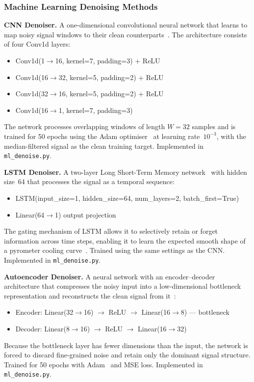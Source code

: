 \subsubsection*{Machine Learning Denoising Methods}

\textbf{CNN Denoiser.} A one-dimensional convolutional neural network that learns to map noisy signal windows to their clean counterparts~\cite{lecun1989backpropagation}. The architecture consists of four Conv1d layers:
\begin{itemize}[nosep]
\item Conv1d(1$\to$16, kernel=7, padding=3) + ReLU
\item Conv1d(16$\to$32, kernel=5, padding=2) + ReLU
\item Conv1d(32$\to$16, kernel=5, padding=2) + ReLU
\item Conv1d(16$\to$1, kernel=7, padding=3)
\end{itemize}
The network processes overlapping windows of length $W=32$ samples and is trained for 50 epochs using the Adam optimiser~\cite{kingma2014adam} at learning rate~$10^{-3}$, with the median-filtered signal as the clean training target. Implemented in \texttt{ml\_denoise.py}.

\textbf{LSTM Denoiser.} A two-layer Long Short-Term Memory network~\cite{hochreiter1997long} with hidden size~64 that processes the signal as a temporal sequence:
\begin{itemize}[nosep]
\item LSTM(input\_size=1, hidden\_size=64, num\_layers=2, batch\_first=True)
\item Linear(64$\to$1) output projection
\end{itemize}
The gating mechanism of LSTM allows it to selectively retain or forget information across time steps, enabling it to learn the expected smooth shape of a pyrometer cooling curve~\cite{ml_thermal_processing}. Trained using the same settings as the CNN. Implemented in \texttt{ml\_denoise.py}.

\textbf{Autoencoder Denoiser.} A neural network with an encoder--decoder architecture that compresses the noisy input into a low-dimensional bottleneck representation and reconstructs the clean signal from it~\cite{autoencoder_compression}:
\begin{itemize}[nosep]
\item Encoder: Linear(32$\to$16) $\to$ ReLU $\to$ Linear(16$\to$8) --- bottleneck
\item Decoder: Linear(8$\to$16) $\to$ ReLU $\to$ Linear(16$\to$32)
\end{itemize}
Because the bottleneck layer has fewer dimensions than the input, the network is forced to discard fine-grained noise and retain only the dominant signal structure. Trained for 50 epochs with Adam~\cite{kingma2014adam} and MSE loss. Implemented in \texttt{ml\_denoise.py}.

